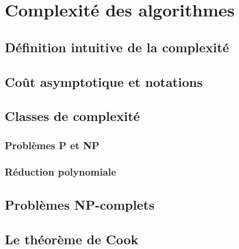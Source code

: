 \chapter{Complexit\'e des algorithmes}\label{chap:complexite}
  \section{D\'efinition intuitive de la complexit\'e}\label{sec:def_complexite}
  \section{Co\^ut asymptotique et notations}\label{sec:cout_asymptotique}
  \section{Classes de complexit\'e}\label{sec:classes_complexite}
    \subsection{Probl\`emes P et NP}\label{subsec:problemes_p_np}
    \subsection{R\'eduction polynomiale}\label{subsec:reduction_polynomiale}
  \section{Probl\`emes NP-complets}\label{sec:problemes_np_complets}
  \section{Le th\'eor\`eme de Cook}\label{sec:theoreme_cook}